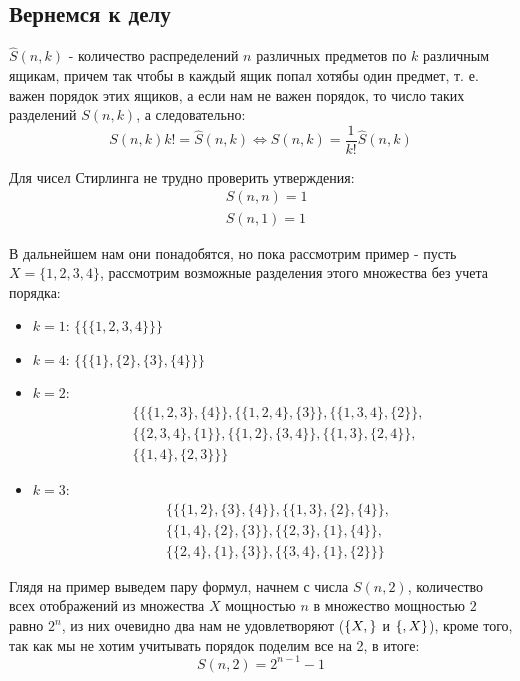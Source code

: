 \subsection{Вернемся к делу}

$\hat S \left(n, k\right)$ - количество распределений $n$ различных предметов по $k$ различным ящикам, причем так чтобы в каждый ящик попал хотябы один предмет, т. е. важен порядок этих ящиков, а если нам не важен порядок, то число таких разделений $S \left(n,k\right)$, а следовательно:
\[
	S \left(n,k\right) k! = \hat S \left(n,k\right) \Leftrightarrow S \left(n, k\right) = \frac{1}{k!} \hat S \left(n,k\right)
\]

Для чисел Стирлинга не трудно проверить утверждения:
\[
	\begin{split}
	& S \left(n,n\right) = 1 \\
	& S \left(n,1\right) = 1
	\end{split}
\]

В дальнейшем нам они понадобятся, но пока рассмотрим пример - пусть $X = \{1,2,3,4\}$, рассмотрим возможные разделения этого множества без учета порядка:
\begin{itemize}
\item $k=1$: $\{\{\{1,2,3,4\}\}\}$

\item $k=4$: $\{\{\{1\},\{2\},\{3\},\{4\}\}\}$

\item $k=2$: \[
	\begin{split}
		& \{\{\{1,2,3\},\{4\}\},\{\{1,2,4\},\{3\}\},\{\{1,3,4\},\{2\}\},\\
		& \{\{2,3,4\},\{1\}\},\{\{1,2\},\{3,4\}\},\{\{1,3\},\{2,4\}\},\\
		& \{\{1,4\},\{2,3\}\}\}
	\end{split}
	\]

\item $k=3$: \[
	\begin{split}
		& \{\{\{1,2\},\{3\},\{4\}\},\{\{1,3\},\{2\},\{4\}\},\\
		& \{\{1,4\},\{2\},\{3\}\},\{\{2,3\},\{1\},\{4\}\},\\
		& \{\{2,4\},\{1\},\{3\}\},\{\{3,4\},\{1\},\{2\}\}\}
	\end{split}
	\]
\end{itemize}

Глядя на пример выведем пару формул, начнем с числа $S\left(n,2\right)$, количество всех отображений из множества $X$ мощностью $n$ в множество мощностью $2$ равно $2^n$, из них очевидно два нам не удовлетворяют ($\{X, \empty\}$ и $\{\empty, X\}$), кроме того, так как мы не хотим учитывать порядок поделим все на 2, в итоге:
\[
	S \left( n,2\right) = 2^{n-1}-1
\]

